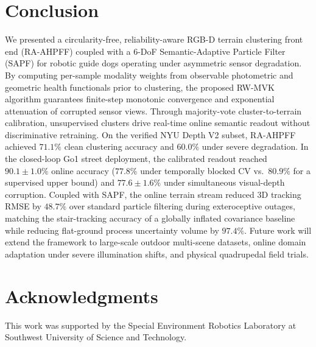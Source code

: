 \documentclass[11pt, a4paper]{article}
\begin{document}
\section{Conclusion}
\label{sec:conclusion}
We presented a circularity-free, reliability-aware RGB-D terrain clustering front end (RA-AHPFF) coupled with a 6-DoF Semantic-Adaptive Particle Filter (SAPF) for robotic guide dogs operating under asymmetric sensor degradation. By computing per-sample modality weights from observable photometric and geometric health functionals prior to clustering, the proposed RW-MVK algorithm guarantees finite-step monotonic convergence and exponential attenuation of corrupted sensor views. Through majority-vote cluster-to-terrain calibration, unsupervised clusters drive real-time online semantic readout without discriminative retraining. On the verified NYU Depth V2 subset, RA-AHPFF achieved $71.1\%$ clean clustering accuracy and $60.0\%$ under severe degradation. In the closed-loop Go1 street deployment, the calibrated readout reached $90.1\pm1.0\%$ online accuracy ($77.8\%$ under temporally blocked CV vs.\ $80.9\%$ for a supervised upper bound) and $77.6\pm1.6\%$ under simultaneous visual-depth corruption. Coupled with SAPF, the online terrain stream reduced 3D tracking RMSE by $48.7\%$ over standard particle filtering during exteroceptive outages, matching the stair-tracking accuracy of a globally inflated covariance baseline while reducing flat-ground process uncertainty volume by $97.4\%$. Future work will extend the framework to large-scale outdoor multi-scene datasets, online domain adaptation under severe illumination shifts, and physical quadrupedal field trials.

\section*{Acknowledgments}
This work was supported by the Special Environment Robotics Laboratory at Southwest University of Science and Technology.
\end{document}
